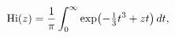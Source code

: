 \[\mathop{\mathrm{Hi}\/}\nolimits\!\left(z\right)=\frac{1}{\pi}\int_{0}^{\infty}%
\mathop{\exp\/}\nolimits\!\left(-\tfrac{1}{3}t^{3}+zt\right)dt,\]